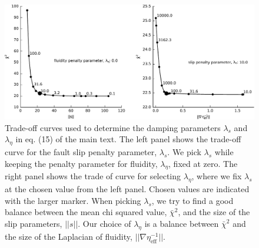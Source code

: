 \documentclass[draft,jgrga]{agutex}
\begin{document}

\begin{figure}
\noindent\includegraphics[scale=1.0]{Figures/Lcurves}
\caption{
Trade-off curves used to determine the damping parameters $\lambda_s$ and $\lambda_\eta$ in eq. (15) of the main text.  The left panel shows the trade-off curve for the fault slip penalty parameter, $\lambda_s$.  We pick $\lambda_s$ while keeping the penalty parameter for fluidity, $\lambda_\eta$, fixed at zero.  The right panel shows the trade of curve for selecting $\lambda_\eta$, where we fix $\lambda_s$ at the chosen value from the left panel. Chosen values are indicated with the larger marker.  When picking $\lambda_s$, we try to find a good balance between the mean chi squared value, $\bar{\chi}^2$, and the size of the slip parameters, $||s||$.  Our choice of $\lambda_\eta$ is a balance between $\bar{\chi}^2$ and the size of the Laplacian of fluidity, $||\nabla \eta_\mathrm{eff}^{-1}||$. 
}
\label{fig:S1}
\end{figure}
\end{document}
